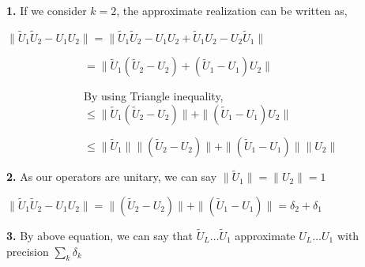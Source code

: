 \documentclass [12pt]{article}
\theoremstyle{definition}
\begin{document}
 \phantom{1em} {\bf 1.} If we consider $k=2$, the approximate realization can be written as, 
 
 \phantom{1000em} $\|\tilde{U}_{1}\tilde{U}_{2} - U_{1}U_{2}\| = \|\tilde{U}_{1}\tilde{U}_{2} - U_{1}U_{2} + \tilde{U}_{1}U_{2} - U_{2}\tilde{U}_{1}\|$
 
 \phantom{1000em} $\quad\quad\quad\quad\quad\quad\quad= \|\tilde{U}_{1}(\tilde{U}_{2} - U_{2}) + (\tilde{U}_{1} - U_{1})U_{2}\|$
 
 \phantom{1000em} $\quad\quad\quad\quad\quad\quad\quad$By using Triangle inequality,\\
 \phantom{1000em} $\quad\quad\quad\quad\quad\quad\quad\leq \|\tilde{U}_{1}(\tilde{U}_{2} - U_{2})\| + \|(\tilde{U}_{1} - U_{1})U_{2}\|$ 
 
 \phantom{1000em} $\quad\quad\quad\quad\quad\quad\quad\leq \|\tilde{U}_{1}\| \|(\tilde{U}_{2} - U_{2})\| + \|(\tilde{U}_{1} - U_{1})\| \|U_{2}\|$ 
 
 \phantom{1em} {\bf 2.} As our operators are unitary, we can say $\|\tilde{U}_{1}\| = \|U_{2}\| = 1$
 
\phantom{1000em} $\|\tilde{U}_{1}\tilde{U}_{2} - U_{1}U_{2}\| = \|(\tilde{U}_{2} - U_{2})\| + \|(\tilde{U}_{1} - U_{1})\| = \delta_{2} + \delta_{1}$

\phantom{1em} {\bf 3.} By above equation, we can say that  $\tilde{U}_{L} \ldots \tilde{U}_{1}$ approximate $U_{L} \ldots U_{1}$ with precision $\sum_{k}\delta_{k}$

\newpage
\end{document}
